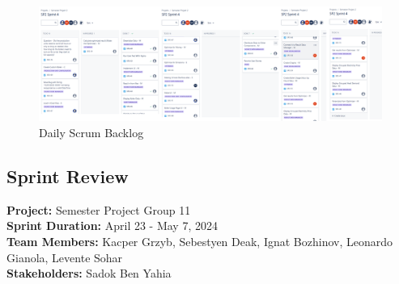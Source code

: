 \documentclass[12pt]{report}
\begin{document}
\begin{figure}[H]
  \centering
  \includegraphics[width=1\textwidth]{Resources/4-Sprint/Daily-Scrum/Backlog.png}
  \caption{Daily Scrum Backlog}
  \label{fig:S4Scrum-image}
\end{figure}
\clearpage

\subsection*{Sprint Review}
\textbf{Project:} Semester Project Group 11 \\
\textbf{Sprint Duration:} April 23 - May 7, 2024 \\
\textbf{Team Members:} Kacper Grzyb, Sebestyen Deak, Ignat Bozhinov, Leonardo Gianola, Levente Sohar \\
\textbf{Stakeholders:} Sadok Ben Yahia
\end{document}
